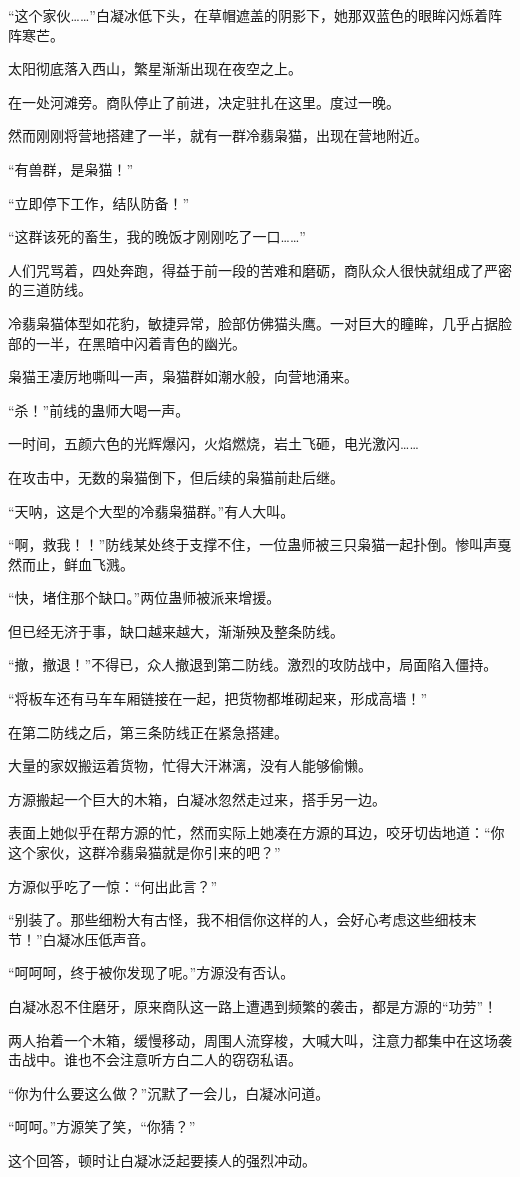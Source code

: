 \begin{this_body}
“这个家伙……”白凝冰低下头，在草帽遮盖的阴影下，她那双蓝色的眼眸闪烁着阵阵寒芒。

太阳彻底落入西山，繁星渐渐出现在夜空之上。

在一处河滩旁。商队停止了前进，决定驻扎在这里。度过一晚。

然而刚刚将营地搭建了一半，就有一群冷翡枭猫，出现在营地附近。

“有兽群，是枭猫！”

“立即停下工作，结队防备！”

“这群该死的畜生，我的晚饭才刚刚吃了一口……”

人们咒骂着，四处奔跑，得益于前一段的苦难和磨砺，商队众人很快就组成了严密的三道防线。

冷翡枭猫体型如花豹，敏捷异常，脸部仿佛猫头鹰。一对巨大的瞳眸，几乎占据脸部的一半，在黑暗中闪着青色的幽光。

枭猫王凄厉地嘶叫一声，枭猫群如潮水般，向营地涌来。

“杀！”前线的蛊师大喝一声。

一时间，五颜六色的光辉爆闪，火焰燃烧，岩土飞砸，电光激闪……

在攻击中，无数的枭猫倒下，但后续的枭猫前赴后继。

“天呐，这是个大型的冷翡枭猫群。”有人大叫。

“啊，救我！！”防线某处终于支撑不住，一位蛊师被三只枭猫一起扑倒。惨叫声戛然而止，鲜血飞溅。

“快，堵住那个缺口。”两位蛊师被派来增援。

但已经无济于事，缺口越来越大，渐渐殃及整条防线。

“撤，撤退！”不得已，众人撤退到第二防线。激烈的攻防战中，局面陷入僵持。

“将板车还有马车车厢链接在一起，把货物都堆砌起来，形成高墙！”

在第二防线之后，第三条防线正在紧急搭建。

大量的家奴搬运着货物，忙得大汗淋漓，没有人能够偷懒。

方源搬起一个巨大的木箱，白凝冰忽然走过来，搭手另一边。

表面上她似乎在帮方源的忙，然而实际上她凑在方源的耳边，咬牙切齿地道：“你这个家伙，这群冷翡枭猫就是你引来的吧？”

方源似乎吃了一惊：“何出此言？”

“别装了。那些细粉大有古怪，我不相信你这样的人，会好心考虑这些细枝末节！”白凝冰压低声音。

“呵呵呵，终于被你发现了呢。”方源没有否认。

白凝冰忍不住磨牙，原来商队这一路上遭遇到频繁的袭击，都是方源的“功劳”！

两人抬着一个木箱，缓慢移动，周围人流穿梭，大喊大叫，注意力都集中在这场袭击战中。谁也不会注意听方白二人的窃窃私语。

“你为什么要这么做？”沉默了一会儿，白凝冰问道。

“呵呵。”方源笑了笑，“你猜？”

这个回答，顿时让白凝冰泛起要揍人的强烈冲动。

\end{this_body}

